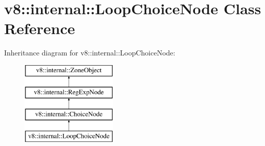 \hypertarget{classv8_1_1internal_1_1_loop_choice_node}{}\section{v8\+:\+:internal\+:\+:Loop\+Choice\+Node Class Reference}
\label{classv8_1_1internal_1_1_loop_choice_node}
Inheritance diagram for v8\+:\+:internal\+:\+:Loop\+Choice\+Node\+:\begin{figure}[H]
\begin{center}
\leavevmode
\includegraphics[height=4.000000cm]{classv8_1_1internal_1_1_loop_choice_node}
\end{center}
\end{figure}
